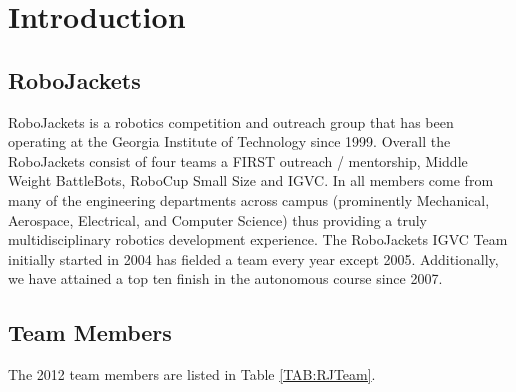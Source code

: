 \section{Introduction}

\subsection{RoboJackets}

RoboJackets is a robotics competition and outreach group that has been operating at the Georgia Institute of Technology since 1999. Overall the RoboJackets consist of four teams a FIRST outreach / mentorship, Middle Weight BattleBots, RoboCup Small Size and IGVC. In all members come from many of the engineering departments across campus (prominently Mechanical, Aerospace, Electrical, and Computer Science) thus providing a truly multidisciplinary robotics development experience. The RoboJackets IGVC Team initially started in 2004 has fielded a team every year except 2005. Additionally, we have attained a top ten finish in the autonomous course since 2007. 

\subsection{Team Members}

The 2012 team members are listed in Table \ref{TAB:RJTeam}.


